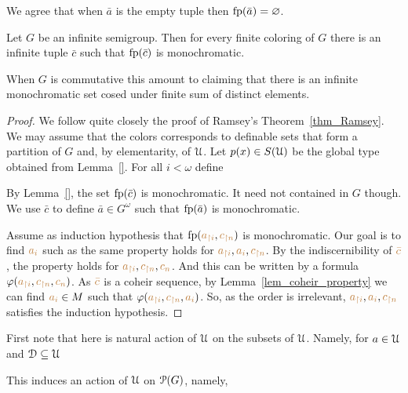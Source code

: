 \documentclass[creche.tex]{subfiles}
\begin{document}
We agree that when $\bar a$ is the empty tuple then $\fp(\bar a)=\0$.

\begin{theorem}
Let $G$ be an infinite semigroup. Then for every finite coloring of $G$ there is an infinite tuple $\bar c$ such that $\fp(\bar c)$ is monochromatic.
\end{theorem}

When $G$ is commutative this amount to claiming that there is an infinite monochromatic set cosed under finite sum of distinct elements.

\begin{proof}
We follow quite closely the proof of Ramsey's Theorem~\ref{thm_Ramsey}. We may assume that the colors corresponds to definable sets that form a partition of $G$ and, by elementarity, of $\U$. Let $p(x)\in S(\U)$ be the global type obtained from Lemma~\ref{}. For all $i<\omega$ define


By  Lemma~\ref{}, the set $\fp(\bar c)$ is monochromatic. It need not contained in $G$ though. We use $\bar c$ to define $\bar a\in G^\omega$ such that $\fp(\bar a)$ is monochromatic.

Assume as induction hypothesis that $\fp({\mr a_{\restriction i}},{\mr c_{\restriction n}})$ is monochromatic. Our goal is to find ${\mr a_i}$ such as the same property holds for ${\mr a_{\restriction i}},{\mr a_i},{\mr c_{\restriction n}}$. By the indiscernibility of ${\mr\bar c}$, the property holds for  ${\mr a_{\restriction i}},{\mr c_{\restriction n}},{\mr{c_n}}$.  And this can be written by a formula $\phi({\mr a_{\restriction i}},{\mr c_{\restriction n}},{\mr{c_n}})$. As ${\mr\bar c}$ is a coheir sequence, by Lemma~\ref{lem_coheir_property} we can find  ${\mr a_i}\in M$ such that  $\phi({\mr a_{\restriction i}},{\mr c_{\restriction n}},{\mr a_i})$. So, as the order is irrelevant,  ${\mr a_{\restriction i}},{\mr a_i},{\mr c_{\restriction n}}$ satisfies the induction hypothesis.
\end{proof}

First note that here is natural action of $\U$ on the subsets of $\U$. Namely, for $a\in\U$ and $\D\subseteq\U$ 


This induces an action of $\U$ on $\P(G)$, namely,

\end{document}
